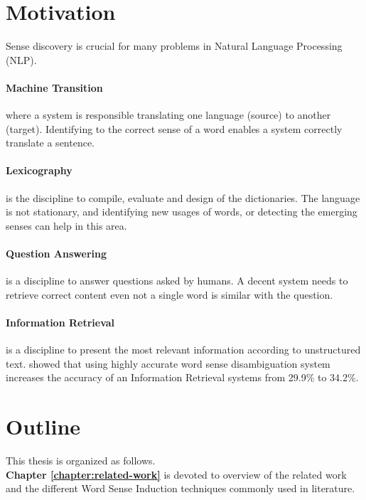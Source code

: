 \section{Motivation}

Sense discovery is crucial for many problems in Natural Language Processing (NLP). 

\paragraph{Machine Transition} where a system is responsible translating one language (source) to another (target). Identifying to the correct sense of a word enables a system correctly translate a sentence.

\paragraph{Lexicography} is the discipline to compile, evaluate and design of the dictionaries. The language is not stationary, and identifying new usages of words, or detecting the emerging senses can help in this area.

\paragraph{Question Answering} is a discipline to answer questions asked by humans. A decent system needs to retrieve correct content even not a single word is similar with the question.

\paragraph{Information Retrieval} is a discipline to present the most relevant information according to unstructured text. \cite{schutze95information} showed that using highly accurate word sense disambiguation system increases the accuracy of an Information Retrieval systems from 29.9\% to
34.2\%.
\section{Outline}

This thesis is organized as follows. \\




\textbf{Chapter \ref{chapter:related-work}} is devoted to overview of the related work and the different Word Sense Induction techniques commonly used in literature. \\


